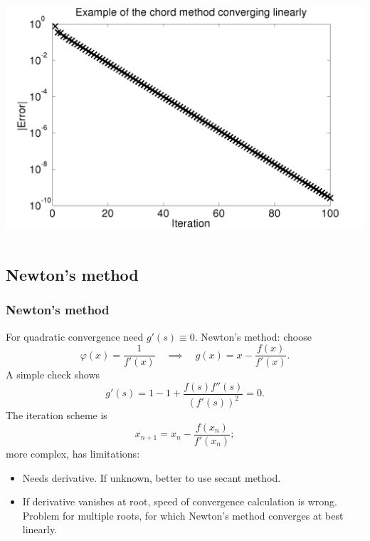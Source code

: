 \documentclass{beamer}
\begin{document}
\begin{frame}
\begin{columns}
\begin{column}{0.5\textwidth}
\begin{overlayarea}{\textwidth}{0.6\textheight}
{\begin{center}
          \end{center}
        }
        {
          \begin{center}
            \includegraphics[width=\textwidth]{figures/Chord1}
          \end{center}
        }
      \end{overlayarea}
    \end{column}
  \end{columns}
\end{frame}


\subsection{Newton's method}

\begin{frame}
  \frametitle{Newton's method}

  For quadratic convergence need $g'(s) \equiv 0$. Newton's method: choose
  \begin{equation*}
    \varphi(x)  = \frac{1}{f'(x)} \quad \implies \quad g(x)  = x - \frac{f(x)}{f'(x)}.
  \end{equation*} \pause
  A simple check shows
  \begin{equation*}
    g'(s)  = 1 - 1 + \frac{f(s) f''(s)}{\left( f'(s) \right)^2} = 0.
  \end{equation*} \pause
  The iteration scheme is
  \begin{equation*}
    x_{n+1} = x_n - \frac{f(x_n)}{f'(x_n)};
  \end{equation*}
  more complex, has limitations: \pause
  \begin{itemize}
  \item Needs derivative. If unknown, better to use secant method.
  \item If derivative vanishes at root, speed of convergence calculation is wrong. Problem for multiple roots, for which Newton's method converges at best linearly.
  \end{itemize}

\end{frame}
\end{document}
